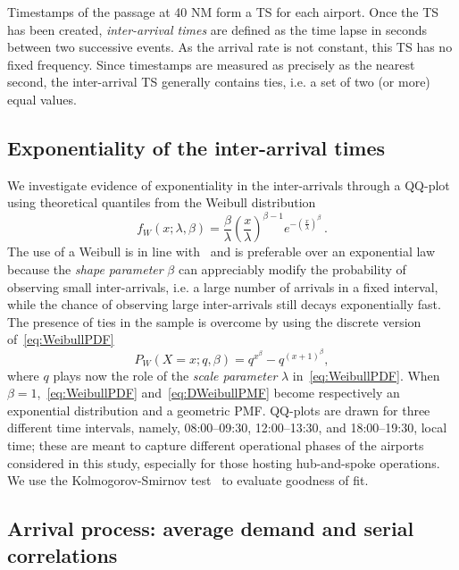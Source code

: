 \documentclass[draft,review]{elsarticle}
\makeatletter
\newcommand*{\ie}{i.e.\@\xspace}
\makeatother
\begin{document}
Timestamps of the passage at 40 NM form a \ac{TS} for each airport.
Once the \ac{TS} has been created, \emph{inter-arrival times} are defined as the time lapse in seconds between two successive events. As the arrival rate is not constant, this \ac{TS} has no fixed frequency.
Since timestamps are measured as precisely as the nearest second, the inter-arrival \ac{TS} generally contains ties, \ie{} a set of two (or more) equal values.

\subsection{Exponentiality of the inter-arrival times}\label{sec:dm_exp}

We investigate evidence of exponentiality in the inter-arrivals through a QQ-plot using theoretical quantiles from the Weibull distribution
\begin{equation}
    f_W(x; \lambda, \beta) = \frac{\beta}{\lambda} \left(\frac{x}{\lambda}\right)^{\beta-1} e^{-(\frac{x}{\lambda})^\beta} \,.
    \label{eq:WeibullPDF}
\end{equation}
The use of a Weibull is in line with~\citet{willemain2004statistical} and is preferable over an exponential law because the \emph{shape parameter} \(\beta\) can appreciably modify the probability of observing small inter-arrivals, \ie{} a large number of arrivals in a fixed interval, while the chance of observing large inter-arrivals still decays exponentially fast.
The presence of ties in the sample is overcome by using the discrete version of~\eqref{eq:WeibullPDF}~\citep{nakagawa1975discrete,barbiero2013discrete}
\begin{equation}
    P_W(X=x;q,\beta) = q^{x^\beta} - q^{(x+1)^\beta},
    \label{eq:DWeibullPMF}
\end{equation}
where \(q\) plays now the role of the \emph{scale parameter} \(\lambda\) in~\eqref{eq:WeibullPDF}.
When \(\beta = 1\),~\eqref{eq:WeibullPDF} and~\eqref{eq:DWeibullPMF} become respectively an exponential distribution and a geometric \ac{PMF}.
QQ-plots are drawn for three different time intervals, namely, 08:00--09:30, 12:00--13:30, and 18:00--19:30, local time; these are meant to capture different operational phases of the airports considered in this study, especially for those hosting hub-and-spoke operations.
We use the Kolmogorov-Smirnov test~\citep{taylor2011nonparam} to evaluate goodness of fit.

\subsection{Arrival process: average demand and serial correlations}\label{sec:dm_serial_corr}
\end{document}

